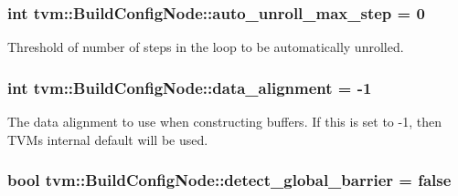 \subsubsection[{\texorpdfstring{auto\+\_\+unroll\+\_\+max\+\_\+step}{auto_unroll_max_step}}]{\setlength{\rightskip}{0pt plus 5cm}int tvm\+::\+Build\+Config\+Node\+::auto\+\_\+unroll\+\_\+max\+\_\+step = 0}\hypertarget{classtvm_1_1BuildConfigNode_a906d69e936afa01fa60a816acc66e095}{}\label{classtvm_1_1BuildConfigNode_a906d69e936afa01fa60a816acc66e095}


Threshold of number of steps in the loop to be automatically unrolled. 

\subsubsection[{\texorpdfstring{data\+\_\+alignment}{data_alignment}}]{\setlength{\rightskip}{0pt plus 5cm}int tvm\+::\+Build\+Config\+Node\+::data\+\_\+alignment = -\/1}\hypertarget{classtvm_1_1BuildConfigNode_a5e2c8350cb1a96b35bc383a23c1fd397}{}\label{classtvm_1_1BuildConfigNode_a5e2c8350cb1a96b35bc383a23c1fd397}


The data alignment to use when constructing buffers. If this is set to -\/1, then T\+VM\textquotesingle{}s internal default will be used. 

\subsubsection[{\texorpdfstring{detect\+\_\+global\+\_\+barrier}{detect_global_barrier}}]{\setlength{\rightskip}{0pt plus 5cm}bool tvm\+::\+Build\+Config\+Node\+::detect\+\_\+global\+\_\+barrier = false}\hypertarget{classtvm_1_1BuildConfigNode_ae3f6cb045e5b3d85bdd39224444cb94d}{}\label{classtvm_1_1BuildConfigNode_ae3f6cb045e5b3d85bdd39224444cb94d}


